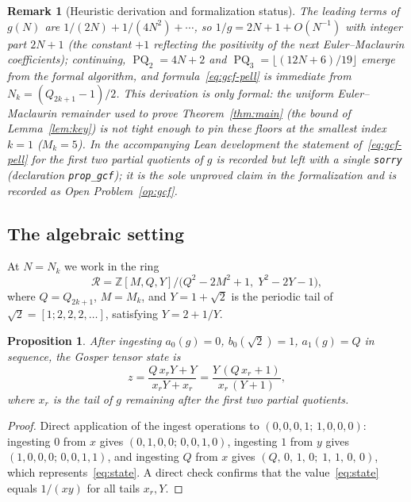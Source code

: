 \documentclass[10pt,a4paper]{amsart}
\newtheorem{proposition}[theorem]{Proposition}
\newtheorem{remark}[theorem]{Remark}
\newcommand{\floor}[1]{\lfloor #1 \rfloor}
\newcommand{\Z}{\mathbb{Z}}
\DeclareMathOperator{\PQ}{PQ}
\begin{document}
\begin{remark}[Heuristic derivation and formalization status]
  The leading terms of $g(N)$ are $1/(2N) + 1/(4N^2) + \cdots$, so
  $1/g = 2N+1 + O(N^{-1})$ with integer part $2N+1$ (the constant $+1$
  reflecting the positivity of the next Euler--Maclaurin coefficients);
  continuing, $\PQ_2 = 4N+2$ and $\PQ_3 = \floor{(12N+6)/19}$ emerge from
  the formal algorithm, and formula~\eqref{eq:gcf-pell} is immediate from
  $N_k = (Q_{2k+1}-1)/2$.  This derivation is only formal: the uniform
  Euler--Maclaurin remainder used to prove Theorem~\ref{thm:main} (the
  bound of Lemma~\ref{lem:key}) is not tight enough to pin these floors at
  the smallest index $k = 1$ ($M_k = 5$).  In the accompanying Lean
  development the statement of~\eqref{eq:gcf-pell} for the first two partial
  quotients of $g$ is recorded but left with a single \texttt{sorry}
  (declaration \texttt{prop\_gcf}); it is the sole unproved claim in the
  formalization and is recorded as Open Problem~\ref{op:gcf}.
\end{remark}

\subsection{The algebraic setting}

At $N = N_k$ we work in the ring
\[
  \mathcal{R} = \Z[M, Q, Y]\big/\bigl(Q^2-2M^2+1,\; Y^2-2Y-1\bigr),
\]
where $Q = Q_{2k+1}$, $M = M_k$, and $Y = 1+\sqrt{2}$ is the periodic
tail of $\sqrt{2} = [1;2,2,2,\ldots]$, satisfying $Y = 2 + 1/Y$.

\begin{proposition}\label{prop:gosper-state}
  After ingesting $a_0(g)=0$, $b_0(\sqrt{2})=1$, $a_1(g)=Q$ in
  sequence, the Gosper tensor state is
  \begin{equation}\label{eq:state}
    z = \frac{Q\,x_r Y + Y}{x_r Y + x_r}
      = \frac{Y\,(Q\,x_r + 1)}{x_r\,(Y+1)},
  \end{equation}
  where $x_r$ is the tail of $g$ remaining after the first two
  partial quotients.
\end{proposition}

\begin{proof}
  Direct application of the ingest operations to $(0,0,0,1;\,1,0,0,0)$:
  ingesting $0$ from $x$ gives $(0,1,0,0;\,0,0,1,0)$, ingesting $1$ from
  $y$ gives $(1,0,0,0;\,0,0,1,1)$, and ingesting $Q$ from $x$ gives
  $(Q,\,0,\,1,\,0;\;1,\,1,\,0,\,0)$, which represents~\eqref{eq:state}.
  A direct check confirms that the value~\eqref{eq:state} equals $1/(xy)$
  for all tails $x_r, Y$.
\end{proof}
\end{document}
